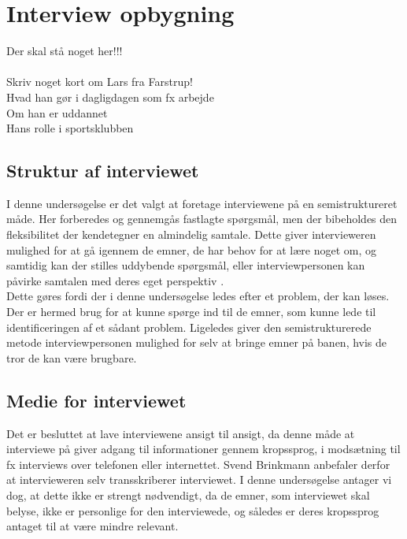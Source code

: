 \section{Interview opbygning}
Der skal stå noget her!!! \\
\\
Skriv noget kort om Lars fra Farstrup!\\
Hvad han gør i dagligdagen som fx arbejde\\
Om han er uddannet\\
Hans rolle i sportsklubben\\


\subsection {Struktur af interviewet}
I denne undersøgelse er det valgt at foretage interviewene på en semistruktureret måde. Her forberedes og gennemgås fastlagte spørgsmål, men der bibeholdes den fleksibilitet der kendetegner en almindelig samtale. Dette giver intervieweren mulighed for at gå igennem de emner, de har behov for at lære noget om, og samtidig kan der stilles uddybende spørgsmål, eller interviewpersonen kan påvirke samtalen med deres eget perspektiv \citep{brinkmann2014}.\\
Dette gøres fordi der i denne undersøgelse ledes efter et problem, der kan løses. Der er hermed brug for at kunne spørge ind til de emner, som kunne lede til identificeringen af et sådant problem. Ligeledes giver den semistrukturerede metode interviewpersonen mulighed for selv at bringe emner på banen, hvis de tror de kan være brugbare.

\subsection {Medie for interviewet}
Det er besluttet at lave interviewene ansigt til ansigt, da denne måde at interviewe på giver adgang til informationer gennem kropssprog, i modsætning til fx interviews over telefonen eller internettet. Svend Brinkmann anbefaler derfor at intervieweren selv transskriberer interviewet.\citep{brinkmann2014} I denne undersøgelse antager vi dog, at dette ikke er strengt nødvendigt, da de emner, som interviewet skal belyse, ikke er personlige for den interviewede, og således er deres kropssprog antaget til at være mindre relevant.









